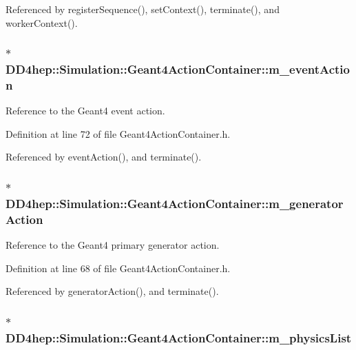 Referenced by registerSequence(), setContext(), terminate(), and workerContext().\hypertarget{class_d_d4hep_1_1_simulation_1_1_geant4_action_container_aa97d07df82c52404b5211277bca15a40}{
\subsubsection[{m\_\-eventAction}]{$\ast$ {\bf DD4hep::Simulation::Geant4ActionContainer::m\_\-eventAction}}}
\label{class_d_d4hep_1_1_simulation_1_1_geant4_action_container_aa97d07df82c52404b5211277bca15a40}


Reference to the Geant4 event action. 

Definition at line 72 of file Geant4ActionContainer.h.

Referenced by eventAction(), and terminate().\hypertarget{class_d_d4hep_1_1_simulation_1_1_geant4_action_container_acbb02aa950b5dc79ca78448a5ff23994}{
\subsubsection[{m\_\-generatorAction}]{$\ast$ {\bf DD4hep::Simulation::Geant4ActionContainer::m\_\-generatorAction}}}
\label{class_d_d4hep_1_1_simulation_1_1_geant4_action_container_acbb02aa950b5dc79ca78448a5ff23994}


Reference to the Geant4 primary generator action. 

Definition at line 68 of file Geant4ActionContainer.h.

Referenced by generatorAction(), and terminate().\hypertarget{class_d_d4hep_1_1_simulation_1_1_geant4_action_container_a8cd72bfb49bd3d62e899591ae65fe7dd}{
\subsubsection[{m\_\-physicsList}]{$\ast$ {\bf DD4hep::Simulation::Geant4ActionContainer::m\_\-physicsList}}}
\label{class_d_d4hep_1_1_simulation_1_1_geant4_action_container_a8cd72bfb49bd3d62e899591ae65fe7dd}


